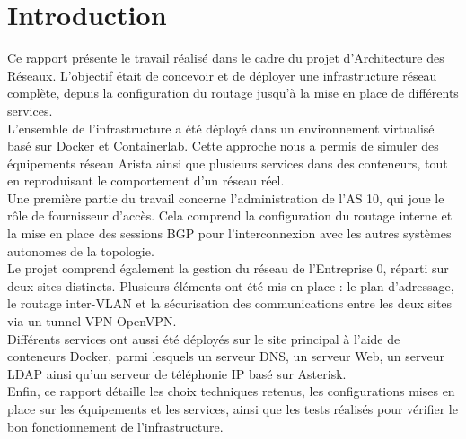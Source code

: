 \section{Introduction}

Ce rapport présente le travail réalisé dans le cadre du projet d'Architecture des Réseaux. L'objectif était de concevoir et de déployer une infrastructure réseau complète, depuis la configuration du routage jusqu'à la mise en place de différents services.\\

L'ensemble de l'infrastructure a été déployé dans un environnement virtualisé basé sur Docker et Containerlab. Cette approche nous a permis de simuler des équipements réseau Arista ainsi que plusieurs services dans des conteneurs, tout en reproduisant le comportement d'un réseau réel.\\

Une première partie du travail concerne l'administration de l'AS 10, qui joue le rôle de fournisseur d'accès. Cela comprend la configuration du routage interne et la mise en place des sessions BGP pour l'interconnexion avec les autres systèmes autonomes de la topologie.\\

Le projet comprend également la gestion du réseau de l'Entreprise 0, réparti sur deux sites distincts. Plusieurs éléments ont été mis en place : le plan d'adressage, le routage inter-VLAN et la sécurisation des communications entre les deux sites via un tunnel VPN OpenVPN.\\

Différents services ont aussi été déployés sur le site principal à l'aide de conteneurs Docker, parmi lesquels un serveur DNS, un serveur Web, un serveur LDAP ainsi qu'un serveur de téléphonie IP basé sur Asterisk.\\

Enfin, ce rapport détaille les choix techniques retenus, les configurations mises en place sur les équipements et les services, ainsi que les tests réalisés pour vérifier le bon fonctionnement de l'infrastructure.
